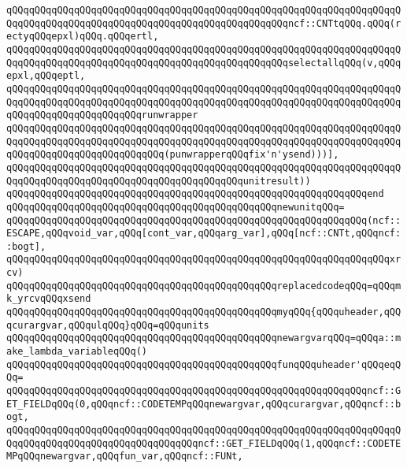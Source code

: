 \verb|qQQqqQQqqQQqqQQqqQQqqQQqqQQqqQQqqQQqqQQqqQQqqQQqqQQqqQQqqQQqqQQqqQQqqQQqqQQqqQQqqQQqqQQqqQQqqQQqqQQqqQQqqQQqqQQqqQQqqQQqncf::CNTtqQQq.qQQq(rectyqQQqepxl)qQQq.qQQqertl,|\newline
\verb|qQQqqQQqqQQqqQQqqQQqqQQqqQQqqQQqqQQqqQQqqQQqqQQqqQQqqQQqqQQqqQQqqQQqqQQqqQQqqQQqqQQqqQQqqQQqqQQqqQQqqQQqqQQqqQQqqQQqqQQqselectallqQQq(v,qQQqepxl,qQQqeptl,|\newline
\verb|qQQqqQQqqQQqqQQqqQQqqQQqqQQqqQQqqQQqqQQqqQQqqQQqqQQqqQQqqQQqqQQqqQQqqQQqqQQqqQQqqQQqqQQqqQQqqQQqqQQqqQQqqQQqqQQqqQQqqQQqqQQqqQQqqQQqqQQqqQQqqQQqqQQqqQQqqQQqqQQqqQQqrunwrapper|\newline
\verb|qQQqqQQqqQQqqQQqqQQqqQQqqQQqqQQqqQQqqQQqqQQqqQQqqQQqqQQqqQQqqQQqqQQqqQQqqQQqqQQqqQQqqQQqqQQqqQQqqQQqqQQqqQQqqQQqqQQqqQQqqQQqqQQqqQQqqQQqqQQqqQQqqQQqqQQqqQQqqQQqqQQqqQQq(punwrapperqQQqfix'n'ysend)))],|\newline
\verb|qQQqqQQqqQQqqQQqqQQqqQQqqQQqqQQqqQQqqQQqqQQqqQQqqQQqqQQqqQQqqQQqqQQqqQQqqQQqqQQqqQQqqQQqqQQqqQQqqQQqqQQqqQQqqQQqunitresult))|\newline
\verb|qQQqqQQqqQQqqQQqqQQqqQQqqQQqqQQqqQQqqQQqqQQqqQQqqQQqqQQqqQQqqQQqend|\newline
\newline
\verb|qQQqqQQqqQQqqQQqqQQqqQQqqQQqqQQqqQQqqQQqqQQqqQQqnewunitqQQq=|\newline
\verb|qQQqqQQqqQQqqQQqqQQqqQQqqQQqqQQqqQQqqQQqqQQqqQQqqQQqqQQqqQQqqQQq(ncf::ESCAPE,qQQqvoid_var,qQQq[cont_var,qQQqarg_var],qQQq[ncf::CNTt,qQQqncf::bogt],|\newline
\verb|qQQqqQQqqQQqqQQqqQQqqQQqqQQqqQQqqQQqqQQqqQQqqQQqqQQqqQQqqQQqqQQqqQQqxrcv)|\newline
\verb|qQQqqQQqqQQqqQQqqQQqqQQqqQQqqQQqqQQqqQQqqQQqqQQqreplacedcodeqQQq=qQQqmk_yrcvqQQqxsend|\newline
\newline
\verb|qQQqqQQqqQQqqQQqqQQqqQQqqQQqqQQqqQQqqQQqqQQqqQQqmyqQQq{qQQquheader,qQQqcurargvar,qQQqulqQQq}qQQq=qQQqunits|\newline
\verb|qQQqqQQqqQQqqQQqqQQqqQQqqQQqqQQqqQQqqQQqqQQqqQQqnewargvarqQQq=qQQqa::make_lambda_variableqQQq()|\newline
\verb|qQQqqQQqqQQqqQQqqQQqqQQqqQQqqQQqqQQqqQQqqQQqqQQqfunqQQquheader'qQQqeqQQq=|\newline
\verb|qQQqqQQqqQQqqQQqqQQqqQQqqQQqqQQqqQQqqQQqqQQqqQQqqQQqqQQqqQQqqQQqncf::GET_FIELDqQQq(0,qQQqncf::CODETEMPqQQqnewargvar,qQQqcurargvar,qQQqncf::bogt,|\newline
\verb|qQQqqQQqqQQqqQQqqQQqqQQqqQQqqQQqqQQqqQQqqQQqqQQqqQQqqQQqqQQqqQQqqQQqqQQqqQQqqQQqqQQqqQQqqQQqqQQqqQQqqQQqncf::GET_FIELDqQQq(1,qQQqncf::CODETEMPqQQqnewargvar,qQQqfun_var,qQQqncf::FUNt,|\newline
